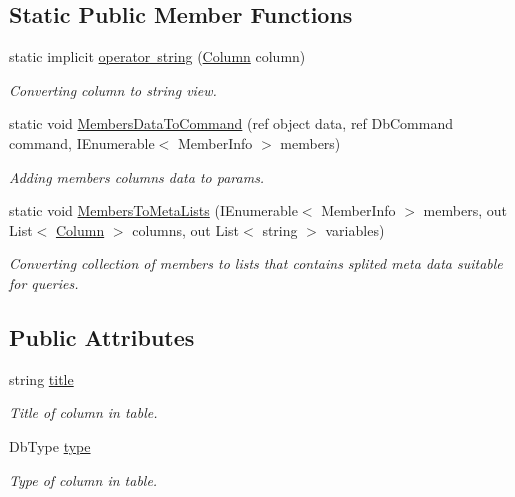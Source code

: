 \subsection*{Static Public Member Functions}
\begin{DoxyCompactItemize}
\item 
static implicit \mbox{\hyperlink{class_uniform_data_operator_1_1_sql_1_1_attributes_1_1_column_a2f2533d559fba4736f749a5eba9852f6}{operator string}} (\mbox{\hyperlink{class_uniform_data_operator_1_1_sql_1_1_attributes_1_1_column}{Column}} column)
\begin{DoxyCompactList}\small\item\em Converting column to string view. \end{DoxyCompactList}\item 
static void \mbox{\hyperlink{class_uniform_data_operator_1_1_sql_1_1_attributes_1_1_column_aa3e174a477fdbeaa14aff1c783c2b1f9}{Members\+Data\+To\+Command}} (ref object data, ref Db\+Command command, I\+Enumerable$<$ Member\+Info $>$ members)
\begin{DoxyCompactList}\small\item\em Adding members columns data to params. \end{DoxyCompactList}\item 
static void \mbox{\hyperlink{class_uniform_data_operator_1_1_sql_1_1_attributes_1_1_column_a7b8f106a53f21e586ef1f8f2ac5a43eb}{Members\+To\+Meta\+Lists}} (I\+Enumerable$<$ Member\+Info $>$ members, out List$<$ \mbox{\hyperlink{class_uniform_data_operator_1_1_sql_1_1_attributes_1_1_column}{Column}} $>$ columns, out List$<$ string $>$ variables)
\begin{DoxyCompactList}\small\item\em Converting collection of members to lists that contain\textquotesingle{}s splited meta data suitable for queries. \end{DoxyCompactList}\end{DoxyCompactItemize}
\subsection*{Public Attributes}
\begin{DoxyCompactItemize}
\item 
string \mbox{\hyperlink{class_uniform_data_operator_1_1_sql_1_1_attributes_1_1_column_af17925ba835ca424a854689016526e93}{title}}
\begin{DoxyCompactList}\small\item\em Title of column in table. \end{DoxyCompactList}\item 
Db\+Type \mbox{\hyperlink{class_uniform_data_operator_1_1_sql_1_1_attributes_1_1_column_ad42f01b863fcea9172fc5efe2b8a0834}{type}}
\begin{DoxyCompactList}\small\item\em Type of column in table. \end{DoxyCompactList}\end{DoxyCompactItemize}


